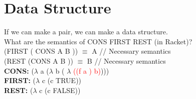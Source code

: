 \documentclass{article}
\begin{document}
\section{Data Structure}

If we can make a pair, we can make a data structure.\\
What are the semantics of CONS FIRST REST (in Racket)?\\
\doublespacing
\hspace{3mm} (FIRST ( CONS A B )) $\equiv$ A // Necessary semantics\\
\hspace{3mm} (REST (CONS A B ))  $\equiv$ B // Necessary semantics\\
\doublespacing
\textbf{CONS:} ($\lambda$ a ($\lambda$ b ( $\lambda$ \textcolor{red}{((f a ) b)})))\\
\textbf{FIRST:} ($\lambda$ c (c TRUE))\\
\textbf{REST:} ($\lambda$ c (c FALSE))\\
\pagebreak
\end{document}
